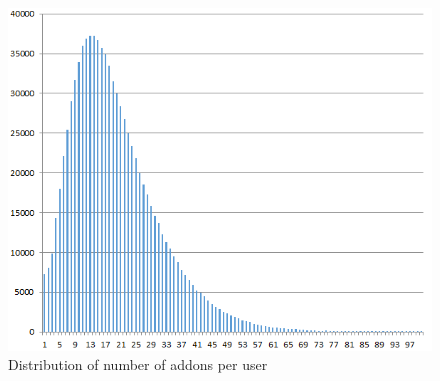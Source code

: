 \documentclass[ijoc,nonblindrev]{informs3} %
\numberwithin{equation}{subsection}
\begin{document}

\begin{figure}[t]
\centering
\begin{small}
\includegraphics[scale=.8,angle=0]{figures/user_addons_histogram1.png}
\end{small}
\caption{Distribution of number of addons per user}
\label{fig:user_addons_histogram}
\end{figure}
\end{document}
